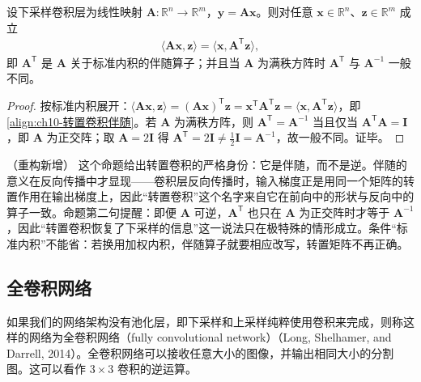 \documentclass[../../main.tex]{subfiles}
\begin{document}
\begin{proposition}[转置卷积是下采样卷积的伴随算子]\label{proposition:ch10-转置卷积伴随}
设下采样卷积层为线性映射 $\mathbf{A}:\mathbb{R}^{n}\to\mathbb{R}^{m}$，$\mathbf{y}=\mathbf{A}\mathbf{x}$。则对任意 $\mathbf{x}\in\mathbb{R}^{n}$、$\mathbf{z}\in\mathbb{R}^{m}$ 成立
\begin{align}
  \langle \mathbf{A}\mathbf{x},\mathbf{z}\rangle=\langle \mathbf{x},\mathbf{A}^{\mathsf{T}}\mathbf{z}\rangle,
  \label{align:ch10-转置卷积伴随}
\end{align}
即 $\mathbf{A}^{\mathsf{T}}$ 是 $\mathbf{A}$ 关于标准内积的伴随算子；并且当 $\mathbf{A}$ 为满秩方阵时 $\mathbf{A}^{\mathsf{T}}$ 与 $\mathbf{A}^{-1}$ 一般不同。
\end{proposition}
\begin{proof}
按标准内积展开：$\langle \mathbf{A}\mathbf{x},\mathbf{z}\rangle=(\mathbf{A}\mathbf{x})^{\mathsf{T}}\mathbf{z}=\mathbf{x}^{\mathsf{T}}\mathbf{A}^{\mathsf{T}}\mathbf{z}=\langle \mathbf{x},\mathbf{A}^{\mathsf{T}}\mathbf{z}\rangle$，即\eqref{align:ch10-转置卷积伴随}。若 $\mathbf{A}$ 为满秩方阵，则 $\mathbf{A}^{\mathsf{T}}=\mathbf{A}^{-1}$ 当且仅当 $\mathbf{A}^{\mathsf{T}}\mathbf{A}=\mathbf{I}$，即 $\mathbf{A}$ 为正交阵；取 $\mathbf{A}=2\mathbf{I}$ 得 $\mathbf{A}^{\mathsf{T}}=2\mathbf{I}\neq\frac12\mathbf{I}=\mathbf{A}^{-1}$，故一般不同。证毕。
\end{proof}

\begin{remark}（重构新增）
这个命题给出转置卷积的严格身份：它是伴随，而不是逆。伴随的意义在反向传播中才显现——卷积层反向传播时，输入梯度正是用同一个矩阵的转置作用在输出梯度上，因此“转置卷积”这个名字来自它在前向中的形状与反向中的算子一致。命题第二句提醒：即便 $\mathbf{A}$ 可逆，$\mathbf{A}^{\mathsf{T}}$ 也只在 $\mathbf{A}$ 为正交阵时才等于 $\mathbf{A}^{-1}$，因此“转置卷积恢复了下采样的信息”这一说法只在极特殊的情形成立。条件“标准内积”不能省：若换用加权内积，伴随算子就要相应改写，转置矩阵不再正确。
\end{remark}

\subsection{全卷积网络}\label{subsection:ch10-全卷积网络}

如果我们的网络架构没有池化层，即下采样和上采样纯粹使用卷积来完成，则称这样的网络为全卷积网络（fully convolutional network）（Long, Shelhamer, and Darrell, 2014）。全卷积网络可以接收任意大小的图像，并输出相同大小的分割图。这可以看作 $3\times 3$ 卷积的逆运算。
\end{document}
